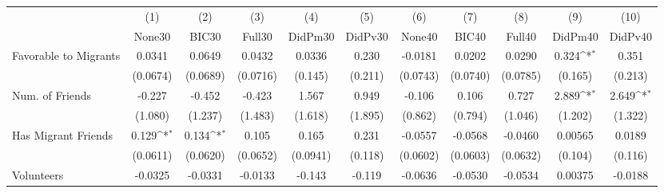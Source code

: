 {
\def\sym#1{\ifmmode^{#1}\else\(^{#1}\)\fi}
\begin{tabular}{l*{10}{c}}
\toprule
            &\multicolumn{1}{c}{(1)}&\multicolumn{1}{c}{(2)}&\multicolumn{1}{c}{(3)}&\multicolumn{1}{c}{(4)}&\multicolumn{1}{c}{(5)}&\multicolumn{1}{c}{(6)}&\multicolumn{1}{c}{(7)}&\multicolumn{1}{c}{(8)}&\multicolumn{1}{c}{(9)}&\multicolumn{1}{c}{(10)}\\
            &\multicolumn{1}{c}{None30}&\multicolumn{1}{c}{BIC30}&\multicolumn{1}{c}{Full30}&\multicolumn{1}{c}{DidPm30}&\multicolumn{1}{c}{DidPv30}&\multicolumn{1}{c}{None40}&\multicolumn{1}{c}{BIC40}&\multicolumn{1}{c}{Full40}&\multicolumn{1}{c}{DidPm40}&\multicolumn{1}{c}{DidPv40}\\
\midrule
Favorable to Migrants&      0.0341         &      0.0649         &      0.0432         &      0.0336         &       0.230         &     -0.0181         &      0.0202         &      0.0290         &       0.324\sym{*}  &       0.351         \\
            &    (0.0674)         &    (0.0689)         &    (0.0716)         &     (0.145)         &     (0.211)         &    (0.0743)         &    (0.0740)         &    (0.0785)         &     (0.165)         &     (0.213)         \\
\addlinespace
Num. of Friends&      -0.227         &      -0.452         &      -0.423         &       1.567         &       0.949         &      -0.106         &       0.106         &       0.727         &       2.889\sym{*}  &       2.649\sym{*}  \\
            &     (1.080)         &     (1.237)         &     (1.483)         &     (1.618)         &     (1.895)         &     (0.862)         &     (0.794)         &     (1.046)         &     (1.202)         &     (1.322)         \\
\addlinespace
Has Migrant Friends&       0.129\sym{*}  &       0.134\sym{*}  &       0.105         &       0.165         &       0.231         &     -0.0557         &     -0.0568         &     -0.0460         &     0.00565         &      0.0189         \\
            &    (0.0611)         &    (0.0620)         &    (0.0652)         &    (0.0941)         &     (0.118)         &    (0.0602)         &    (0.0603)         &    (0.0632)         &     (0.104)         &     (0.116)         \\
\addlinespace
Volunteers  &     -0.0325         &     -0.0331         &     -0.0133         &      -0.143         &      -0.119         &     -0.0636         &     -0.0530         &     -0.0534         &     0.00375         &     -0.0188         \\

\end{tabular}}
